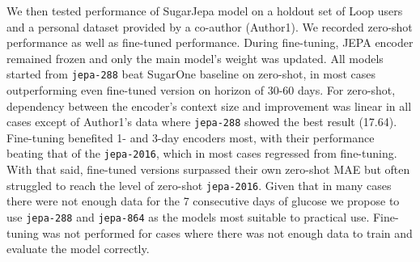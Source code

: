 \documentclass[11pt,a4paper]{article}
\begin{document}
We then tested performance of SugarJepa model on a holdout set of Loop users and a personal dataset provided by a co-author (Author1). We recorded zero-shot performance as well as fine-tuned performance. During fine-tuning, JEPA encoder remained frozen and only the main model's weight was updated. All models started from \texttt{jepa-288} beat SugarOne baseline on zero-shot, in most cases outperforming even fine-tuned version on horizon of 30-60 days. For zero-shot, dependency between the encoder's context size and improvement was linear in all cases except of Author1's data where \texttt{jepa-288} showed the best result (17.64). Fine-tuning benefited 1- and 3-day encoders most, with their performance beating that of the \texttt{jepa-2016}, which in most cases regressed from fine-tuning. With that said, fine-tuned versions surpassed their own zero-shot MAE but often struggled to reach the level of zero-shot \texttt{jepa-2016}. Given that in many cases there were not enough data for the 7 consecutive days of glucose we propose to use \texttt{jepa-288} and \texttt{jepa-864} as the models most suitable to practical use. Fine-tuning was not performed for cases where there was not enough data to train and evaluate the model correctly. 
\end{document}
